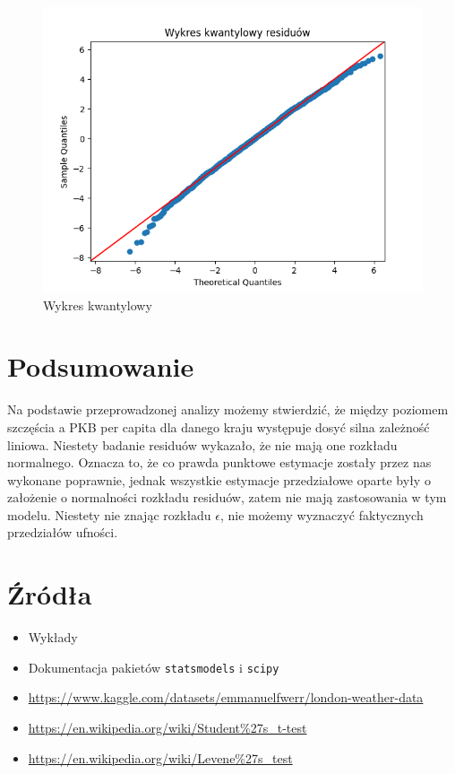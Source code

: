 \documentclass{article}
\theoremstyle{break}
\newcommand{\code}[1]{\colorbox{light-gray}{\texttt{#1}}}
\begin{document}
\begin{figure}[H]
	\begin{center}
		\includegraphics[scale=0.63]{res_qq.png}
		\caption{Wykres kwantylowy}
		\label{fig:res_qq}
	\end{center}
\end{figure}

	\section{Podsumowanie}
	
	Na podstawie przeprowadzonej analizy możemy stwierdzić, że między poziomem szczęścia a PKB per capita dla danego kraju występuje dosyć silna zależność liniowa. Niestety badanie residuów wykazało, że nie mają one rozkładu normalnego. Oznacza to, że co prawda punktowe estymacje zostały przez nas wykonane poprawnie, jednak wszystkie estymacje przedziałowe oparte były o założenie o normalności rozkładu residuów, zatem nie mają zastosowania w tym modelu. Niestety nie znając rozkładu $\epsilon$, nie możemy wyznaczyć faktycznych przedziałów ufności.
	
	\section{Źródła}
	\begin{itemize}
		\item Wykłady
		\item Dokumentacja pakietów \code{statsmodels} i \code{scipy}
		\item \url{https://www.kaggle.com/datasets/emmanuelfwerr/london-weather-data}
		\item \url{https://en.wikipedia.org/wiki/Student%27s_t-test}
		\item \url{https://en.wikipedia.org/wiki/Levene%27s_test}
		
	\end{itemize}
	
	
\end{document}
